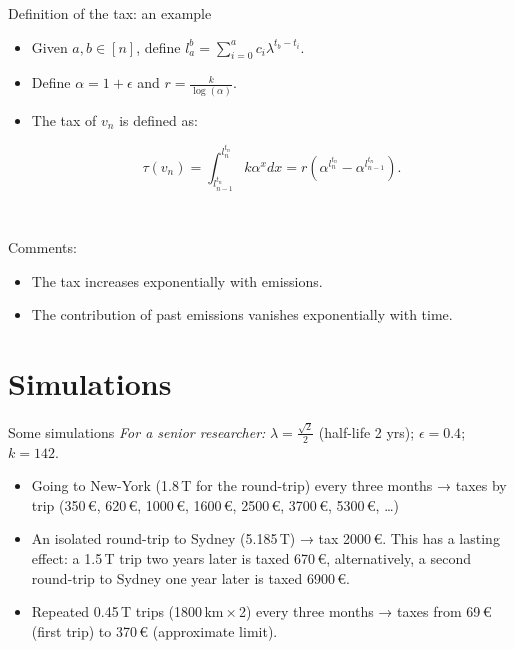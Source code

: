 \documentclass[french, english]{beamer}
\begin{document}
\begin{frame}{Definition of the tax: an example}
    \begin{itemize}
    \item Given $a,b \in [n]$, define $l_a^{b} = \sum_{i = 0}^a c_i \lambda^{t_b - t_i}$.
    \item Define $\alpha = 1 + \epsilon$ and $r = \frac{k}{\log(\alpha)}$.
    \item The tax of $v_n$ is defined as: \begin{tcolorbox}$$ \tau(v_n) = \int_{l_{n-1}^{t_n}}^{l_n^{t_n}} k \alpha^x dx = r (\alpha^{l_n^{t_n}} - \alpha^{l_{n - 1}^{t_n}}).$$\end{tcolorbox}
    \end{itemize}	
    
    \

   Comments:
   \begin{itemize}
   \item The tax increases exponentially with emissions.
   \item The contribution of past emissions vanishes exponentially with time.
   \end{itemize}

\end{frame}

\section{Simulations}
\begin{frame}{Some simulations}
    \emph{For a senior researcher:}
    $\lambda = \frac{\sqrt{2}}{2}$ (half-life 2 yrs); $\epsilon = 0.4$; $k = 142$.

    \begin{itemize}
	\item Going to New-York (1.8\,T for the round-trip) every three months → taxes by trip (350\,€, 620\,€, 1000\,€, 1600\,€, 2500\,€, 3700\,€, 5300\,€, …)
	\item An isolated round-trip to Sydney (5.185\,T) → tax 2000\,€. This has a lasting effect: a 1.5\,T trip two years later is taxed 670\,€, alternatively, a second round-trip to Sydney one year later is taxed 6900\,€.
	\item Repeated 0.45\,T trips (1800\,km\,×\,2) every three months → taxes from 69\,€ (first trip) to 370\,€ (approximate limit).
	\end{itemize}
\end{frame}
\end{document}
